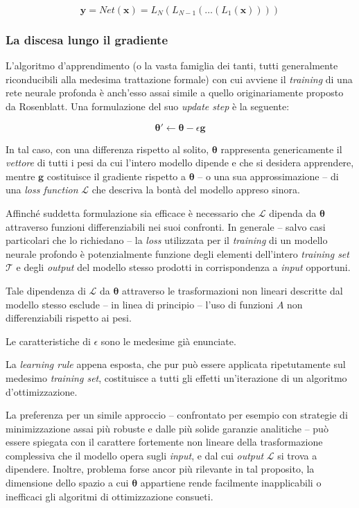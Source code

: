 \documentclass[a4paper, twoside]{article}
\begin{document}
$$
\boldsymbol{y} = Net(\boldsymbol{x}) = L_N( L_{N-1}(\dots (L_1(\boldsymbol{x}))) )
$$


\subsubsection{La discesa lungo il gradiente}

L'algoritmo d'apprendimento (o la vasta famiglia dei tanti, tutti generalmente riconducibili alla medesima trattazione formale) con cui avviene il \textit{training} di una rete neurale profonda è anch'esso assai simile a quello originariamente proposto da Rosenblatt. Una formulazione del suo \textit{update step} è la seguente:

$$
\boldsymbol{\theta'} \leftarrow \boldsymbol{\theta} - \epsilon \boldsymbol{g}
$$

In tal caso, con una differenza rispetto al solito, $\boldsymbol{\theta}$ rappresenta genericamente il \textit{vettore} di tutti i pesi da cui l'intero modello dipende e che si desidera apprendere, mentre $\boldsymbol{g}$ costituisce il gradiente rispetto a $\boldsymbol{\theta}$ -- o una sua approssimazione -- di una \textit{loss function} $\mathcal{L}$ che descriva la bontà del modello appreso sinora.

Affinché suddetta formulazione sia efficace è necessario che $\mathcal{L}$ dipenda da $\boldsymbol{\theta}$ attraverso funzioni differenziabili nei suoi confronti. In generale -- salvo casi particolari che lo richiedano -- la \textit{loss} utilizzata per il \textit{training} di un modello neurale profondo è potenzialmente funzione degli elementi dell'intero \textit{training set} $\mathcal{T}$ e degli \textit{output} del modello stesso prodotti in corrispondenza a \textit{input} opportuni.

Tale dipendenza di $\mathcal{L}$ da $\boldsymbol{\theta}$ attraverso le trasformazioni non lineari descritte dal modello stesso esclude  -- in linea di principio -- l'uso di funzioni $A$ non differenziabili rispetto ai pesi.

Le caratteristiche di $\epsilon$ sono le medesime già enunciate.

La \textit{learning rule} appena esposta, che pur può essere applicata ripetutamente sul medesimo \textit{training set}, costituisce a tutti gli effetti un'iterazione di un algoritmo d'ottimizzazione.

La preferenza per un simile approccio -- confrontato per esempio con strategie di minimizzazione assai più robuste e dalle più solide garanzie analitiche -- può essere spiegata con il carattere fortemente non lineare della trasformazione complessiva che il modello opera sugli \textit{input}, e dal cui \textit{output} $\mathcal{L}$ si trova a dipendere. Inoltre, problema forse ancor più rilevante in tal proposito, la dimensione dello spazio a cui $\boldsymbol{\theta}$ appartiene rende facilmente inapplicabili o inefficaci gli algoritmi di ottimizzazione consueti.
\end{document}
